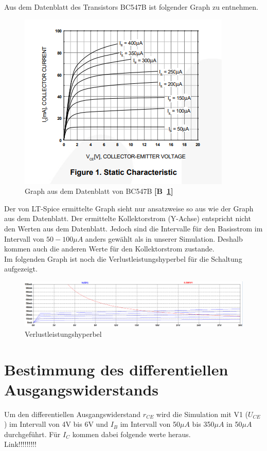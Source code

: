         Aus dem Datenblatt des Transistors BC547B ist folgender Graph zu entnehmen.

        \begin{figure}[!ht]
            \centering
            \includegraphics[]{Bilder/25datenblatt.PNG}
            \caption{Graph aus dem Datenblatt von BC547B \textbf{[B~\ref{fig:252}]}}
            \label{fig:252}
        \end{figure}

        Der von LT-Spice ermittelte Graph sieht nur ansatzweise so aus wie der Graph aus dem Datenblatt. Der ermittelte Kollektorstrom (Y-Achse) entspricht nicht den Werten aus dem Datenblatt. Jedoch sind die Intervalle für den Basisstrom im Intervall von $50-100\mu A$ anders gewählt als in unserer Simulation. Deshalb kommen auch die anderen Werte für den Kollektorstrom zustande.\\
        Im folgenden Graph ist noch die Verlustleistungshyperbel für die Schaltung aufgezeigt.

        
        \begin{figure}[!ht]
            \centering
            \includegraphics[width=\linewidth]{Bilder/25Verlustl.PNG}
            \caption{Verlustleistungshyperbel}
        \end{figure}

    \section{Bestimmung des differentiellen Ausgangswiderstands}
        Um den differentiellen Ausgangswiderstand \(r_{CE}\) wird die Simulation mit V1 (\(U_{CE}\)) im Intervall von 4V bis 6V und \(I_B\) im Intervall von 50\(\mu A\) bis 350\(\mu A\) in 50\(\mu A\) durchgeführt. Für $I_C$ kommen dabei folgende werte heraus. \\
        Link!!!!!!!!!\\

